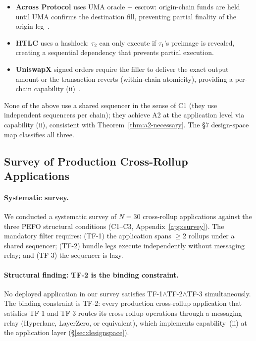 \begin{itemize}
  \item \textbf{Across Protocol} uses UMA oracle + escrow: origin-chain funds
    are held until UMA confirms the destination fill, preventing partial
    finality of the origin leg~\cite{Across-Protocol}.
  \item \textbf{HTLC} uses a hashlock: $\tau_2$ can only execute if
    $\tau_1$'s preimage is revealed, creating a sequential dependency that
    prevents partial execution.
  \item \textbf{UniswapX} signed orders require the filler to deliver the
    exact output amount or the transaction reverts (within-chain atomicity),
    providing a per-chain capability (ii)~\cite{UniswapX}.
\end{itemize}

\noindent None of the above use a shared sequencer in the sense of C1
(they use independent sequencers per chain); they achieve A2 at the
application level via capability (ii), consistent with Theorem~\ref{thm:a2-necessary}.
The §7 design-space map classifies all three.

\subsection{Survey of Production Cross-Rollup Applications}
\label{sec:pefo-survey}

\paragraph{Systematic survey.}
We conducted a systematic survey of $N=30$ cross-rollup applications against
the three PEFO structural conditions (C1--C3, Appendix~\ref{app:survey}).
The mandatory filter requires: (TF-1) the application spans $\geq 2$ rollups
under a shared sequencer; (TF-2) bundle legs execute independently without
messaging relay; and (TF-3) the sequencer is lazy.

\paragraph{Structural finding: TF-2 is the binding constraint.}
No deployed application in our survey satisfies TF-1$\wedge$TF-2$\wedge$TF-3
simultaneously. The binding constraint is TF-2: every production cross-rollup
application that satisfies TF-1 and TF-3 routes its cross-rollup operations
through a messaging relay (Hyperlane, LayerZero, or equivalent), which
implements capability~(ii) at the application layer (\S\ref{sec:designspace}).

